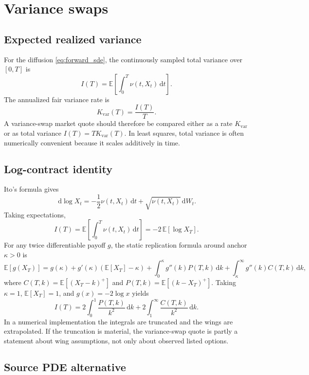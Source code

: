 \documentclass[11pt]{article}
\newcommand{\E}{\mathbb{E}}
\newcommand{\1}{\mathbf{1}}
\newcommand{\dd}{\,\mathrm{d}}
\newcommand{\vloc}{\nu}
\begin{document}
\section{Variance swaps}

\subsection{Expected realized variance}

For the diffusion \eqref{eq:forward_sde}, the continuously sampled total variance over
$[0,T]$ is
\[
  I(T)=\E\left[\int_0^T \vloc(t,X_t)\dd t\right].
\]
The annualized fair variance rate is
\[
  K_{\mathrm{var}}(T)=\frac{I(T)}{T}.
\]
A variance-swap market quote should therefore be compared either as a rate
$K_{\mathrm{var}}$ or as total variance $I(T)=TK_{\mathrm{var}}(T)$. In least squares,
total variance is often numerically convenient because it scales additively in time.

\subsection{Log-contract identity}

Ito's formula gives
\[
  \dd\log X_t
  =
  -\frac12\vloc(t,X_t)\dd t+\sqrt{\vloc(t,X_t)}\dd W_t.
\]
Taking expectations,
\begin{equation}
  I(T)
  =
  \E\left[\int_0^T\vloc(t,X_t)\dd t\right]
  =
  -2\,\E[\log X_T].
  \label{eq:log_contract_identity}
\end{equation}
For any twice differentiable payoff $g$, the static replication formula around anchor
$\kappa>0$ is
\[
  \E[g(X_T)]
  =
  g(\kappa)+g'(\kappa)(\E[X_T]-\kappa)
  +\int_0^\kappa g''(k)P(T,k)\dd k
  +\int_\kappa^\infty g''(k)C(T,k)\dd k,
\]
where $C(T,k)=\E[(X_T-k)^+]$ and $P(T,k)=\E[(k-X_T)^+]$.
Taking $\kappa=1$, $\E[X_T]=1$, and $g(x)=-2\log x$ yields
\begin{equation}
  \boxed{
  I(T)=2\int_0^1\frac{P(T,k)}{k^2}\dd k
      +2\int_1^\infty\frac{C(T,k)}{k^2}\dd k.
  }
  \label{eq:variance_swap_static_replication}
\end{equation}
In a numerical implementation the integrals are truncated and the wings are extrapolated.
If the truncation is material, the variance-swap quote is partly a statement about wing
assumptions, not only about observed listed options.

\subsection{Source PDE alternative}
\end{document}
